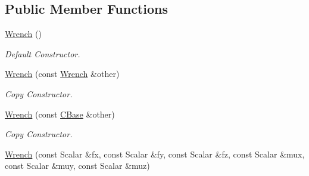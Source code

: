 \subsection*{Public Member Functions}
\begin{DoxyCompactItemize}
\item 
\hyperlink{classow__core_1_1Wrench_a3b052077efbd8a5029346ffb3507ab92}{Wrench} ()\hypertarget{classow__core_1_1Wrench_a3b052077efbd8a5029346ffb3507ab92}{}\label{classow__core_1_1Wrench_a3b052077efbd8a5029346ffb3507ab92}

\begin{DoxyCompactList}\small\item\em Default Constructor. \end{DoxyCompactList}\item 
\hyperlink{classow__core_1_1Wrench_a39221f4ba0b808776a0ba1fb600516de}{Wrench} (const \hyperlink{classow__core_1_1Wrench}{Wrench} \&other)\hypertarget{classow__core_1_1Wrench_a39221f4ba0b808776a0ba1fb600516de}{}\label{classow__core_1_1Wrench_a39221f4ba0b808776a0ba1fb600516de}

\begin{DoxyCompactList}\small\item\em Copy Constructor. \end{DoxyCompactList}\item 
\hyperlink{classow__core_1_1Wrench_a00accbccb32e7a5dbfffe7d575c1efd8}{Wrench} (const \hyperlink{classow__core_1_1CartesianBase}{C\+Base} \&other)\hypertarget{classow__core_1_1Wrench_a00accbccb32e7a5dbfffe7d575c1efd8}{}\label{classow__core_1_1Wrench_a00accbccb32e7a5dbfffe7d575c1efd8}

\begin{DoxyCompactList}\small\item\em Copy Constructor. \end{DoxyCompactList}\item 
\hyperlink{classow__core_1_1Wrench_a6512229ca05780aa52c97ba0c427cd2f}{Wrench} (const Scalar \&fx, const Scalar \&fy, const Scalar \&fz, const Scalar \&mux, const Scalar \&muy, const Scalar \&muz)\hypertarget{classow__core_1_1Wrench_a6512229ca05780aa52c97ba0c427cd2f}{}\label{classow__core_1_1Wrench_a6512229ca05780aa52c97ba0c427cd2f}


\end{DoxyCompactItemize}
